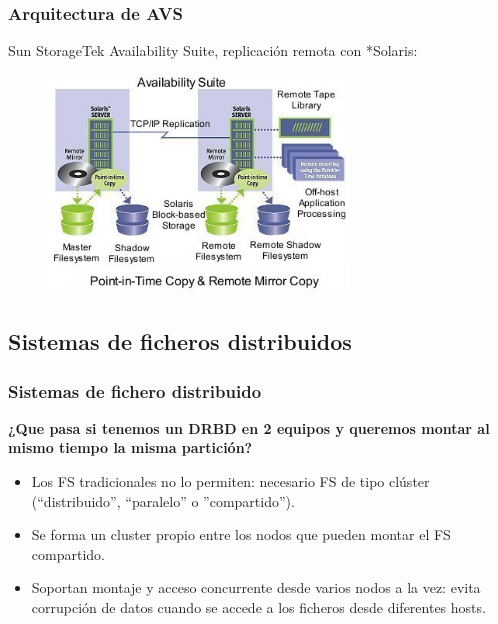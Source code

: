 \documentclass{beamer}
\begin{document}
\begin{frame}
  \frametitle{Arquitectura de AVS}

Sun StorageTek Availability Suite, replicación remota con *Solaris:

\begin{figure}[h]
\begin{center}
  \includegraphics[width=8cm]{figs/availabilitysuitenew.jpg}
\end{center}
\end{figure}

\end{frame}

\subsection{Sistemas de ficheros distribuidos}
\begin{frame}
  \frametitle{Sistemas de fichero distribuido}

\begin{center}
\textbf{¿Que pasa si tenemos un DRBD en 2 equipos y queremos montar al mismo tiempo la misma partición?}
\end{center}

\pause
  \begin{itemize}
    \item Los \alert{FS tradicionales no lo permiten}: necesario FS de tipo clúster (``distribuido'', ``paralelo'' o ''compartido'').
    \item Se forma un cluster propio entre los nodos que pueden montar el FS compartido.
    \item Soportan montaje y \alert{acceso concurrente desde varios nodos} a la vez: evita corrupción de datos cuando se accede a los ficheros desde diferentes hosts.
  \end{itemize}
\end{frame}
\end{document}
